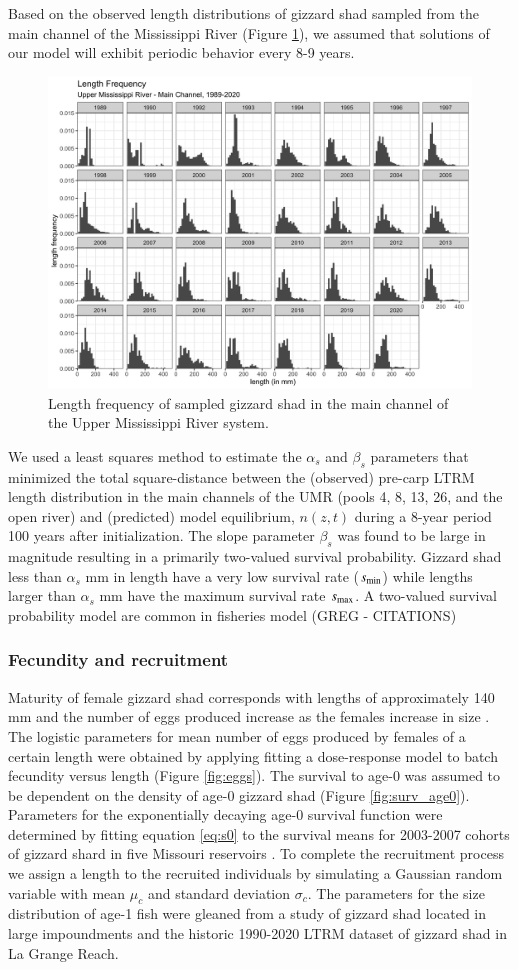 \documentclass[preprint,review,12pt,authoryear]{elsarticle}
\def\ds{\displaystyle}
\begin{document}
Based on the observed length distributions of gizzard shad sampled from the main channel of the Mississippi River (Figure \ref{fig:main}), we assumed that solutions of our model will exhibit periodic behavior every 8-9 years.  
\begin{figure} 
\centering
  \includegraphics[width=.6\textwidth]{figures/LTRMmain.png}
\caption{Length frequency of sampled gizzard shad in the main channel of the Upper Mississippi River system.}
 \label{fig:main}
\end{figure}    
We used a least squares method to estimate the $\alpha_s$ and $\beta_s$ parameters that 
minimized the total square-distance between the (observed) pre-carp LTRM length distribution in the main channels of the UMR (pools 4, 8, 13, 26, and the open river) and (predicted) model equilibrium, $n(z,t)$ during a 8-year period 100 years after initialization.  
The slope parameter $\beta_s$ was found to be large in magnitude resulting in a primarily two-valued survival probability.  
Gizzard shad less than $\alpha_s$ mm in length have a very low survival rate ($\ds s_{\rm {min}}$) while lengths larger than  $\alpha_s$ mm have the maximum survival rate $\ds s_{\rm {max}}$. 
A two-valued survival probability model are common in fisheries model (GREG - CITATIONS)

\subsubsection{Fecundity and recruitment}
Maturity of female gizzard shad corresponds with lengths of approximately 140 mm and the number of eggs produced increase as the females increase in size \citep{jons1997ovarian}. 
The logistic parameters for mean number of eggs produced by females of a certain length were obtained by applying fitting a dose-response model to batch fecundity versus length \citep{jons1997ovarian} (Figure \ref{fig:eggs}). 
The survival to age-0 was assumed to be dependent on the density of age-0 gizzard shad (Figure \ref{fig:surv_age0}).  
Parameters for the exponentially decaying age-0 survival function were determined by fitting equation \ref{eq:s0} to the survival means  for 2003-2007 cohorts of gizzard shard in five Missouri reservoirs \citep{michaletz2010overwinter}.
To complete the recruitment process we assign a length to the recruited individuals by simulating a Gaussian random variable with mean $\mu_c$ and standard deviation $\sigma_c$.
The parameters for the size distribution of age-1 fish were gleaned from a study of gizzard shad located in large impoundments \citep{michaletz2017variation} and the historic 1990-2020 LTRM dataset of gizzard shad in La Grange Reach.
\end{document}

